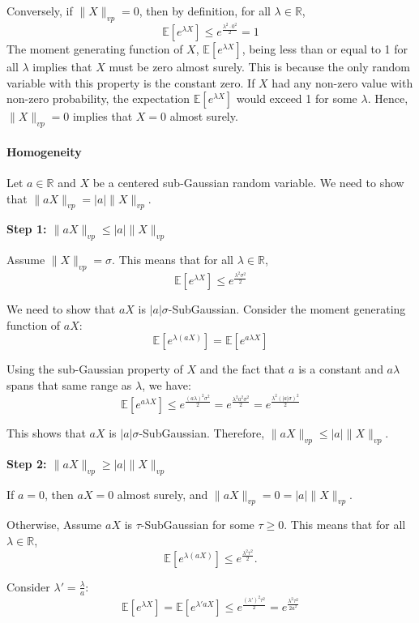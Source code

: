 \documentclass[a4 paper]{article}
\numberwithin{equation}{section}
\theoremstyle{boldStyle}
\theoremstyle{boldBlueStyle}
\theoremstyle{boldPurpleStyle}
\theoremstyle{boldRedStyle}
\begin{document}
\begin{enumerate}
Conversely, if \(\|X\|_{vp} = 0\), then by definition, for all \(\lambda \in \mathbb{R}\),
\[
\mathbb{E}\left[e^{\lambda X}\right] \leq e^{\frac{\lambda^2 \cdot 0^2}{2}} = 1
\]
The moment generating function of \(X\), \(\mathbb{E}\left[e^{\lambda X}\right]\), being less than or equal to 1 for all \(\lambda\) implies that \(X\) must be zero almost surely. This is because the only random variable with this property is the constant zero. If \(X\) had any non-zero value with non-zero probability, the expectation \(\mathbb{E}\left[e^{\lambda X}\right]\) would exceed 1 for some \(\lambda\). Hence, \(\|X\|_{vp} = 0\) implies that \(X = 0\) almost surely.




\paragraph{Homogeneity}
Let \(a \in \mathbb{R}\) and \(X\) be a centered sub-Gaussian random variable. We need to show that \(\|aX\|_{vp} = |a| \|X\|_{vp}\).

\textbf{Step 1: \(\|aX\|_{vp} \leq |a| \|X\|_{vp}\)}

Assume \(\|X\|_{vp} = \sigma\). This means that for all \(\lambda \in \mathbb{R}\),
\[
\mathbb{E}\left[e^{\lambda X}\right] \leq e^{\frac{\lambda^2 \sigma^2}{2}}
\]

We need to show that \(aX\) is \(|a|\sigma\)-SubGaussian. Consider the moment generating function of \(aX\):
\[
\mathbb{E}\left[e^{\lambda (aX)}\right] = \mathbb{E}\left[e^{a\lambda X}\right]
\]

Using the sub-Gaussian property of \(X\) and the fact that \(a\) is a constant and $a\lambda$ spans that same range as $\lambda$, we have:
\[
\mathbb{E}\left[e^{a\lambda X}\right] \leq e^{\frac{(a\lambda)^2 \sigma^2}{2}} = e^{\frac{\lambda^2 a^2 \sigma^2}{2}} = e^{\frac{\lambda^2 (|a|\sigma)^2}{2}}
\]

This shows that \(aX\) is \(|a|\sigma\)-SubGaussian. Therefore, $\|aX\|_{vp} \leq |a| \|X\|_{vp}$. 

\textbf{Step 2: \(\|aX\|_{vp} \geq |a| \|X\|_{vp}\)}

If $a = 0$, then $aX = 0$ almost surely, and $\|aX\|_{vp} = 0 = |a| \|X\|_{vp}$.

Otherwise, Assume \(aX\) is \(\tau\)-SubGaussian for some \(\tau \geq 0\). This means that for all \(\lambda \in \mathbb{R}\),
\[
\mathbb{E}\left[e^{\lambda (aX)}\right] \leq e^{\frac{\lambda^2 \tau^2}{2}}.
\]

Consider \(\lambda' = \frac{\lambda}{a}\):
\[
\mathbb{E}\left[e^{\lambda X}\right] = \mathbb{E}\left[e^{\lambda' aX}\right] \leq e^{\frac{(\lambda')^2 \tau^2}{2}} = e^{\frac{\lambda^2 \tau^2}{2a^2}}
\]


\end{enumerate}
\end{document}
